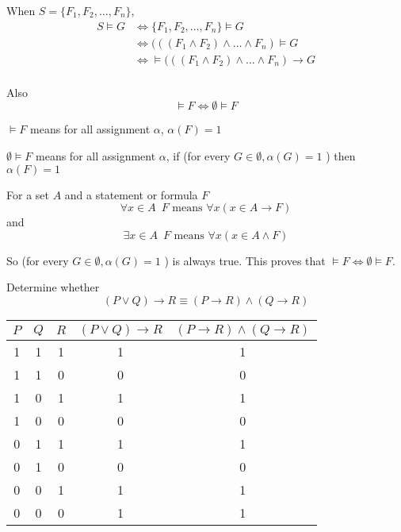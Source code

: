 When $S = \{F_1,F_2,\dots , F_n\} $,
\begin{align*}
S \vDash G &\Leftrightarrow \{F_1,F_2,\dots , F_n\} \vDash G\\
&\Leftrightarrow (((F_1\wedge F_2)\wedge \dots \wedge F_n) \vDash G\\
&\Leftrightarrow \vDash (((F_1\wedge F_2)\wedge \dots \wedge F_n) \to G\\
\end{align*}

Also $$\vDash F \Leftrightarrow \emptyset \vDash F$$

$\vDash F$ means for all assignment $\alpha$, $\alpha (F) = 1 $

$\emptyset \vDash F$ means for all assignment $\alpha$, if (for every $G \in \emptyset, \alpha (G) = 1$ ) then $\alpha (F) = 1$


\begin{nota}
For a set $A$ and a statement or formula $F$
$$\forall x\in A \enspace F \text{ means } \forall x (x\in A \to F)$$
and 
$$\exists x\in A \enspace F \text{ means } \forall x (x\in A \wedge F)$$
\end{nota}

So (for every $G \in \emptyset, \alpha (G) = 1$ ) is always true. This proves that $\vDash F \Leftrightarrow \emptyset \vDash F$.

\begin{exmp}
 Determine whether $$(P \vee Q)\to R \equiv (P\to R)\wedge (Q\to R)$$
\end{exmp}
\begin{solution}
\begin{center}
\begin{tabular}{c|c|c|c|c}
     $P$ & $Q$ & $R$ & $(P \vee Q)\to R$ &  $(P\to R)\wedge (Q\to R)$\\\hline
     1 & 1 & 1 & 1 & 1 \\\hline
     1 & 1 & 0 & 0 & 0 \\\hline
     1 & 0 & 1 & 1 & 1 \\\hline
     1 & 0 & 0 & 0 & 0 \\\hline
     0 & 1 & 1 & 1 & 1 \\\hline
     0 & 1 & 0 & 0 & 0 \\\hline
     0 & 0 & 1 & 1 & 1 \\\hline
     0 & 0 & 0 & 1 & 1 
\end{tabular}
\end{center}

\end{solution}

